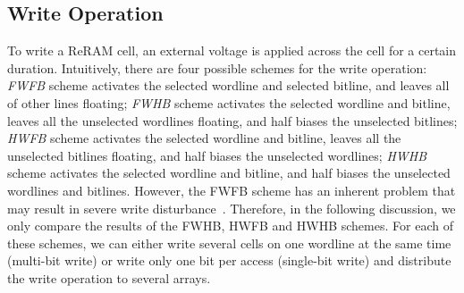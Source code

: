 \subsection{Write Operation}
To write a ReRAM cell, an external voltage is applied across the cell for
a certain duration. Intuitively, there are four possible schemes for the
write operation: \emph{FWFB} scheme activates the selected wordline and
selected bitline, and leaves all of other lines floating; \emph{FWHB}
scheme activates the selected wordline and bitline, leaves all the
unselected wordlines floating, and half biases the unselected bitlines;
\emph{HWFB} scheme activates the selected wordline and bitline, leaves all
the unselected bitlines floating, and half biases the unselected
wordlines; \emph{HWHB} scheme activates the selected wordline and bitline,
and half biases the unselected wordlines and bitlines. However, the FWFB
scheme has an inherent problem that may result in severe write
disturbance~\cite{crossbar_NANO2003_Ziegler}. Therefore, in the following
discussion, we only compare the results of the FWHB, HWFB and HWHB
schemes. For each of these schemes, we can either write several cells on
one wordline at the same time (multi-bit write) or write only one bit per
access (single-bit write) and distribute the write operation to several
arrays.

